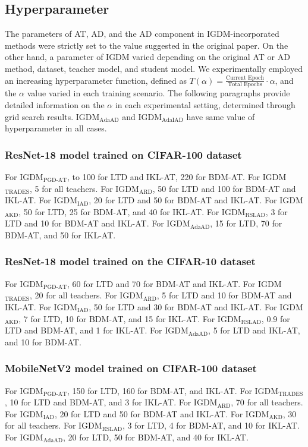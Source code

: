 \documentclass{article} %
\begin{document}
\subsection{Hyperparameter}
The parameters of AT, AD, and the AD component in IGDM-incorporated methods were strictly set to the value suggested in the original paper.
On the other hand, a parameter of IGDM varied depending on the original AT or AD method, dataset, teacher model, and student model.
We experimentally employed an increasing hyperparameter function, defined as $T(\alpha) = \frac{\text{Current Epoch}}{\text{Total Epochs}}\cdot \alpha$, and the $\alpha$ value varied in each training scenario.
The following paragraphs provide detailed information on the $\alpha$ in each experimental setting, determined through grid search results.
IGDM$_{\text{AdaAD}}$ and IGDM$_{\text{AdaIAD}}$ have same value of hyperparameter in all cases.

\subsubsection{ResNet-18 model trained on CIFAR-100 dataset}
For IGDM$_{\text{PGD-AT}}$, to 100 for LTD and IKL-AT, 220 for BDM-AT.
For IGDM$_{\text{TRADES}}$, 5 for all teachers.
For IGDM$_{\text{ARD}}$, 50 for LTD and 100 for BDM-AT and IKL-AT.
For IGDM$_{\text{IAD}}$, 20 for LTD and 50 for BDM-AT and IKL-AT.
For IGDM$_{\text{AKD}}$, 50 for LTD, 25 for BDM-AT, and 40 for IKL-AT.
For IGDM$_{\text{RSLAD}}$, 3 for LTD and 10 for BDM-AT and IKL-AT.
For IGDM$_{\text{AdaAD}}$, 15 for LTD, 70 for BDM-AT, and 50 for IKL-AT.

\subsubsection{ResNet-18 model trained on the CIFAR-10 dataset}
For IGDM$_{\text{PGD-AT}}$, 60 for LTD and 70 for BDM-AT and IKL-AT.
For IGDM$_{\text{TRADES}}$, 20 for all teachers.
For IGDM$_{\text{ARD}}$, 5 for LTD and 10 for BDM-AT and IKL-AT.
For IGDM$_{\text{IAD}}$, 50 for LTD and 30 for BDM-AT and IKL-AT.
For IGDM$_{\text{AKD}}$, 7 for LTD, 10 for BDM-AT, and 15 for IKL-AT.
For IGDM$_{\text{RSLAD}}$, 0.9 for LTD and BDM-AT, and 1 for IKL-AT.
For IGDM$_{\text{AdaAD}}$, 5 for LTD and IKL-AT, and 10 for BDM-AT.

\subsubsection{MobileNetV2 model trained on CIFAR-100 dataset}
For IGDM$_{\text{PGD-AT}}$, 150 for LTD, 160 for BDM-AT, and IKL-AT.
For IGDM$_{\text{TRADES}}$, 10 for LTD and BDM-AT, and 3 for IKL-AT.
For IGDM$_{\text{ARD}}$, 70 for all teachers.
For IGDM$_{\text{IAD}}$, 20 for LTD and 50 for BDM-AT and IKL-AT.
For IGDM$_{\text{AKD}}$, 30 for all teachers.
For IGDM$_{\text{RSLAD}}$, 3 for LTD, 4 for BDM-AT, and 10 for IKL-AT.
For IGDM$_{\text{AdaAD}}$, 20 for LTD, 50 for BDM-AT, and 40 for IKL-AT.
\end{document}
